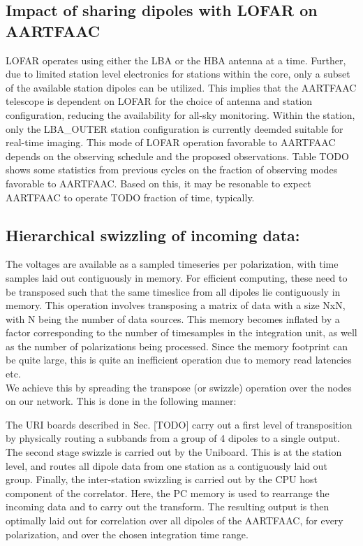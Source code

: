 \documentclass{ws-jai}
\begin{document}
\subsection {\label{subsec:impact_lofar} Impact of sharing dipoles with LOFAR on AARTFAAC}
LOFAR operates using either  the LBA or the HBA antenna at  a time. Further, due
to limited station level electronics for stations within the core, only a subset
of the available station dipoles can be utilized. This implies that the AARTFAAC
telescope  is  dependent  on  LOFAR  for  the  choice  of  antenna  and  station
configuration,  reducing the  availability  for all-sky  monitoring. Within  the
station, only the LBA\_OUTER station configuration is currently deemded suitable
for  real-time imaging.   This mode  of  LOFAR operation  favorable to  AARTFAAC
depends on  the observing  schedule and the  proposed observations.   Table TODO
shows some  statistics from previous cycles  on the fraction of  observing modes
favorable to AARTFAAC. Based on this, it  may be resonable to expect AARTFAAC to
operate TODO fraction of time, typically.

\subsection {Hierarchical swizzling of incoming data:} The voltages are available as
a sampled timeseries  per polarization, with time samples  laid out contiguously
in memory.  For  efficient computing, these need to be  transposed such that the
same  timeslice from  all dipoles  lie  contiguously in  memory. This  operation
involves transposing a matrix  of data with a size NxN, with  N being the number
of data sources.  This memory becomes  inflated by a factor corresponding to the
number  of  timesamples in  the  integration  unit, as  well  as  the number  of
polarizations being  processed. Since the  memory footprint can be  quite large,
this is quite an inefficient operation due to memory read latencies etc.\\

We achieve this by spreading the transpose (or swizzle) operation over the nodes
on our network. This is done in the following manner:
   
The  URI  boards  described  in  Sec.    [TODO]  carry  out  a  first  level  of
transposition by physically  routing a subbands from  a group of 4  dipoles to a
single output. The second stage swizzle is  carried out by the Uniboard. This is
at  the  station level,  and  routes  all dipole  data  from  one station  as  a
contiguously laid out group. Finally, the inter-station swizzling is carried out
by the  CPU host component  of the  correlator. Here, the  PC memory is  used to
rearrange the incoming data and to carry out the transform. The resulting output
is then optimally laid out for correlation over all dipoles of the AARTFAAC, for
every polarization, and over the chosen integration time range.
\end{document}
